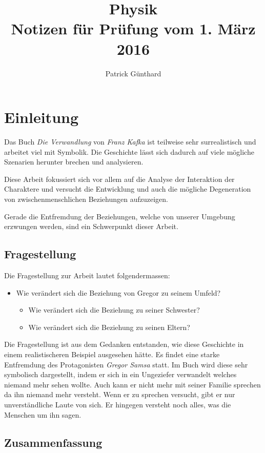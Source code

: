 \documentclass[12pt,a4paper,twoside,titlepage]{article}
\title{\textbf{Physik}\\Notizen für Prüfung vom 1. März 2016}
\author{Patrick Günthard}
\begin{document}
	\maketitle
	
	\tableofcontents
	
	\section{Einleitung}
	
	
	Das Buch \textit{Die Verwandlung} von \textit{Franz Kafka} ist teilweise sehr surrealistisch und arbeitet viel mit Symbolik. Die Geschichte lässt sich dadurch auf viele mögliche Szenarien herunter brechen und analysieren.
	
	Diese Arbeit fokussiert sich vor allem auf die Analyse der Interaktion der Charaktere und versucht die Entwicklung und auch die mögliche Degeneration von zwischenmenschlichen Beziehungen aufzuzeigen.
	
	Gerade die Entfremdung der Beziehungen, welche von unserer Umgebung erzwungen werden, sind ein Schwerpunkt dieser Arbeit.
	
	
	\subsection{Fragestellung}
	Die Fragestellung zur Arbeit lautet folgendermassen:
	\begin{itemize}
		\item Wie verändert sich die Beziehung von Gregor zu seinem Umfeld?
		\begin{itemize}
			\item Wie verändert sich die Beziehung zu seiner Schwester?
			\item Wie verändert sich die Beziehung zu seinen Eltern?
		\end{itemize}
	\end{itemize}
	
	Die Fragestellung ist aus dem Gedanken entstanden, wie diese Geschichte in einem realistischeren Beispiel ausgesehen hätte. Es findet eine starke Entfremdung des Protagonisten \textit{Gregor Samsa} statt. Im Buch wird diese sehr symbolisch dargestellt, indem er sich in ein Ungeziefer verwandelt welches niemand mehr sehen wollte. Auch kann er nicht mehr mit seiner Familie sprechen da ihn niemand mehr versteht. Wenn er zu sprechen versucht, gibt er nur unverständliche Laute von sich. Er hingegen versteht noch alles, was die Menschen um ihn sagen.
	
	\subsection{Zusammenfassung}
	
\end{document}
